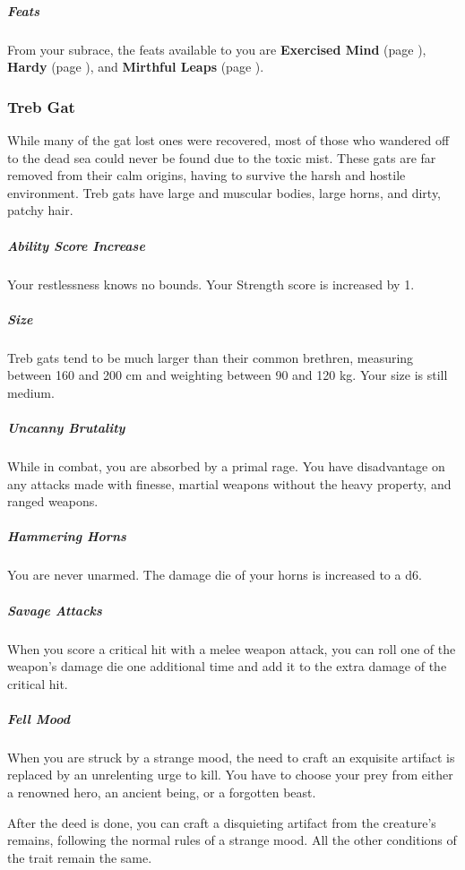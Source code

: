     \subparagraph{Feats} From your subrace, the feats available to you are
    \textbf{Exercised Mind} (page \pageref{feat::exercisedmind}),
    \textbf{Hardy} (page \pageref{feat::hardy}), and
    \textbf{Mirthful Leaps} (page \pageref{feat::mirthfulleaps}).

\subsubsection{Treb Gat}
    While many of the gat lost ones were recovered, most of those who wandered off to the dead sea could never be found due to the toxic mist.
    These gats are far removed from their calm origins, having to survive the harsh and hostile environment.
    Treb gats have large and muscular bodies, large horns, and dirty, patchy hair.

    \subparagraph{Ability Score Increase} Your restlessness knows no bounds.
    Your Strength score is increased by 1.

    \subparagraph{Size} Treb gats tend to be much larger than their common brethren, measuring between 160 and 200 cm and weighting between 90 and 120 kg.
    Your size is still medium.

    \subparagraph{Uncanny Brutality} While in combat, you are absorbed by a primal rage.
    You have disadvantage on any attacks made with finesse, martial weapons without the heavy property, and ranged weapons.

    \subparagraph{Hammering Horns} You are never unarmed.
    The damage die of your horns is increased to a d6.

    \subparagraph{Savage Attacks} When you score a critical hit with a melee weapon attack, you can roll one of the weapon's damage die one additional time and add it to the extra damage of the critical hit.

    \subparagraph{Fell Mood} When you are struck by a strange mood, the need to craft an exquisite artifact is replaced by an unrelenting urge to kill.
    You have to choose your prey from either a renowned hero, an ancient being, or a forgotten beast.

    After the deed is done, you can craft a disquieting artifact from the creature's remains, following the normal rules of a strange mood.
    All the other conditions of the trait remain the same.%

